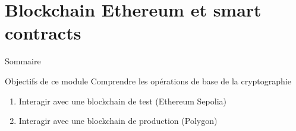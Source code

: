 \section{Blockchain Ethereum et smart contracts}

\begin{frame}{Sommaire}
  \setcounter{tocdepth}{2}
\end{frame}

\begin{frame}{Objectifs de ce module}
  Comprendre les opérations de base de la cryptographie
  \begin{enumerate}
    \item Interagir avec une blockchain de test (Ethereum Sepolia)
    \item Interagir avec une blockchain de production (Polygon)
  \end{enumerate}
\end{frame}





